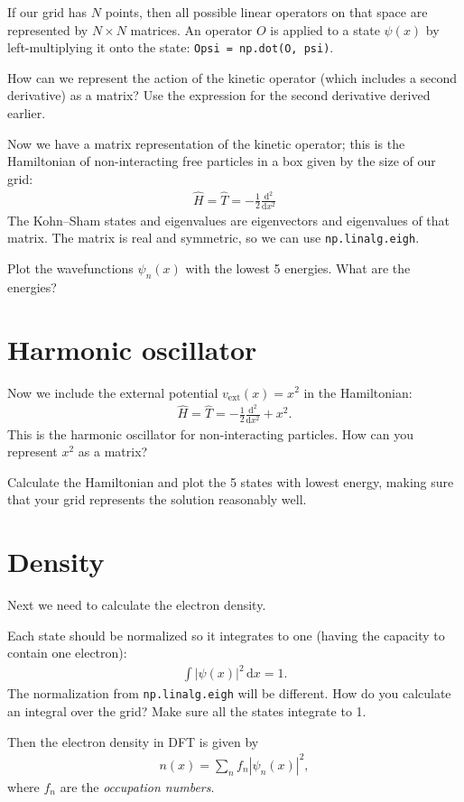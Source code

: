 \documentclass{article}
\newcommand{\dee}[0]{\mathrm d}
\newcommand{\idee}[0]{\,\dee}
\newcommand{\diff}[2]{\frac{\dee #1}{\dee #2}}
\begin{document}
If our grid has $N$ points, then all possible linear operators on that
space are represented by $N\times N$ matrices.  An operator $O$ is
applied to a state $\psi(x)$ by left-multiplying it onto the state:
\texttt{Opsi = np.dot(O, psi)}.

How can we represent the action of the kinetic operator (which
includes a second derivative) as a matrix?  Use the expression
for the second derivative derived earlier.

Now we have a matrix representation of the kinetic operator; this
is the Hamiltonian of non-interacting free particles in a box given by
the size of our grid:
\begin{align}
  \hat H = \hat T = -\frac12 \diff{^2}{x^2}
\end{align}
The Kohn--Sham states and eigenvalues are eigenvectors and
eigenvalues of that matrix.  The matrix is real and symmetric, so we can use
\texttt{np.linalg.eigh}.

Plot the wavefunctions $\psi_n(x)$ with the lowest 5 energies.  What are the energies?

\section{Harmonic oscillator}
Now we include the external potential $v_{\mathrm{ext}}(x) = x^2$ in the Hamiltonian:
\begin{align}
  \hat H = \hat T = -\frac12 \diff{^2}{x^2} + x^2.
\end{align}
This is the harmonic oscillator for non-interacting particles.
How can you represent $x^2$ as a matrix?

Calculate the Hamiltonian and plot the 5 states with lowest energy,
making sure that your grid represents the solution reasonably well.

\section{Density}
Next we need to calculate the electron density.

Each state should be normalized so it integrates to one (having the
capacity to contain one electron):
\begin{align}
  \int |\psi(x)|^2 \idee x = 1.
\end{align}
The normalization from \texttt{np.linalg.eigh} will be different.
How do you calculate an integral over the grid?
Make sure all the states integrate to 1.

Then the electron density in DFT is given by
\begin{align}
  n(x) = \sum_n f_n |\psi_n(x)|^2,
\end{align}
where $f_n$ are the \emph{occupation numbers}.
\end{document}
